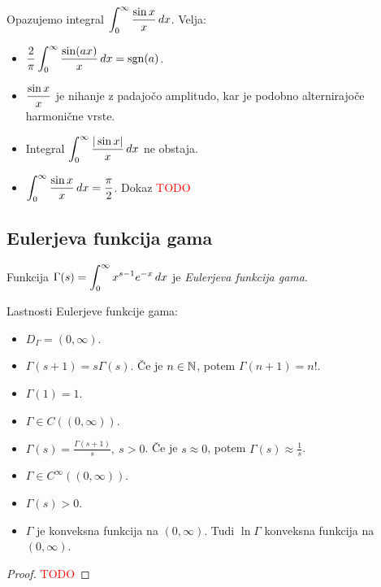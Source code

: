 \begin{zgled}
   Opazujemo integral \(\displaystyle \int_{0}^{\infty} \frac{\sin x}{x} \, dx\). Velja:
   \begin{itemize}
    \item \(\displaystyle \frac{2}{\pi} \int_{0}^{\infty} \frac{\sin (ax)}{x} \, dx = \operatorname{sgn} (a)\).
    \item \(\displaystyle \frac{\sin x}{x}\) je nihanje z padajočo amplitudo, kar je podobno alternirajoče harmonične vrste.
    \item Integral \(\displaystyle \int_{0}^{\infty} \frac{|\sin x|}{x} \, dx\) ne obstaja.
    \item \(\displaystyle \int_{0}^{\infty} \frac{\sin x}{x} \, dx = \frac{\pi}{2}\). Dokaz \textcolor{red}{TODO}
   \end{itemize}
\end{zgled}

\newpage
\subsection{Eulerjeva funkcija gama}
\begin{definicija}
    Funkcija $\displaystyle \Gamma (s) = \int_{0}^{\infty} x^{s-1}e^{-x} \, dx$ je \emph{Eulerjeva funkcija gama}.
\end{definicija}

\begin{trditev}
    Lastnosti Eulerjeve funkcije gama:
    \begin{itemize}
        \item $D_\Gamma = (0, \infty)$.
        \item \(\Gamma(s+1) = s \Gamma(s)\). Če je \(n \in \mathbb{N}\), potem \(\Gamma(n+1) = n!\).
        \item \(\Gamma(1) = 1\).
        \item \(\Gamma  \in C((0, \infty))\).
        \item \(\Gamma (s) = \frac{\Gamma (s+1)}{s}, \ s > 0\). Če je \(s \approx 0\), potem \(\Gamma(s) \approx \frac{1}{s}\).
        \item \(\Gamma \in C^\infty ((0, \infty))\).
        \item \(\Gamma(s)>0\).
        \item \(\Gamma\) je konveksna funkcija na \((0, \infty)\). Tudi \(\ln \Gamma\) konveksna funkcija na \((0, \infty)\).
    \end{itemize}
\end{trditev}

\begin{proof}
    \textcolor{red}{TODO}
\end{proof}

